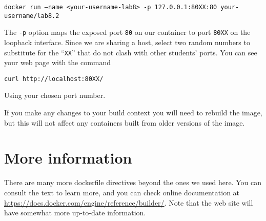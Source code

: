\documentclass{article}
\begin{document}
\texttt{docker run --name <your-username-lab8> -p 127.0.0.1:80XX:80 your-username/lab8.2}

The \texttt{-p} option maps the exposed port \texttt{80} on our container to port \texttt{80XX} on the loopback interface. Since we are sharing a host, select two random numbers to substitute for the ``\texttt{XX}'' that do not clash with other students' ports. You can see your web page with the command

\texttt{curl http://localhost:80XX/}

Using your chosen port number.

If you make any changes  to your build context you will need to rebuild the image, but this will not affect any containers built from older versions of the image.


\section{More information}
There are many more dockerfile directives beyond the ones we used here. You can consult the text to learn more, and you can check online documentation at \url{https://docs.docker.com/engine/reference/builder/}. Note that the web site will have somewhat more up-to-date information.
\end{document}
